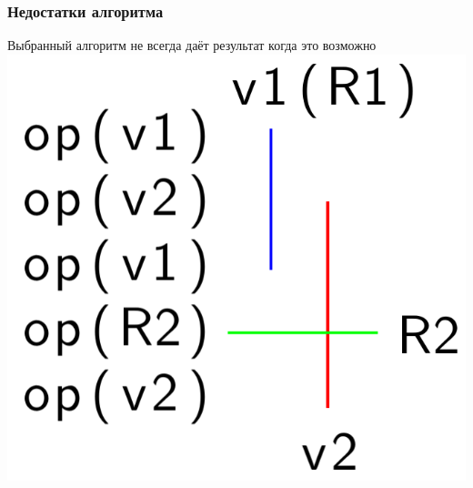 \documentclass[10pt,a4paper]{beamer}
\begin{document}
\begin{frame}[fragile]
    \frametitle{Недостатки алгоритма}

    Выбранный алгоритм не всегда даёт результат когда это возможно
    \includegraphics[scale=0.4]{fail_when_possible.png}
\end{frame}
\end{document}

